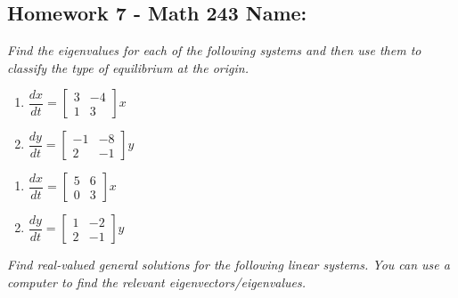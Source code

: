 \documentclass[10pt]{article}
\begin{document}
\pagestyle{empty}
\subsection*{Homework 7 - Math 243 \hfill Name: \underline{\hspace*{2in}}}


\noindent
\textit{Find the eigenvalues for each of the following systems and then use them to classify the type of equilibrium at the origin.} 
\begin{multicols}{2}
\begin{enumerate}
\setcounter{enumi}{\theenumCount}
\item $\dfrac{dx}{dt} =  \begin{bmatrix} 3 & -4 \\ 1 & 3 \end{bmatrix}x$

\item $\dfrac{dy}{dt} = \begin{bmatrix} -1 & -8 \\ 2 & -1 \end{bmatrix}y$
\setcounter{enumCount}{\theenumi}
\end{enumerate} 
\end{multicols}
\vfill

\begin{multicols}{2}
\begin{enumerate}
\setcounter{enumi}{\theenumCount}
\item $\dfrac{dx}{dt} =  \begin{bmatrix} 5 & 6 \\ 0 & 3 \end{bmatrix}x$

\item $\dfrac{dy}{dt} = \begin{bmatrix} 1 & -2 \\ 2 & -1 \end{bmatrix}y$
\setcounter{enumCount}{\theenumi}
\end{enumerate} 
\end{multicols}

\vfill



\noindent
\textit{Find real-valued general solutions for the following linear systems.  You can use a computer to find the relevant eigenvectors/eigenvalues.}
\end{document}
